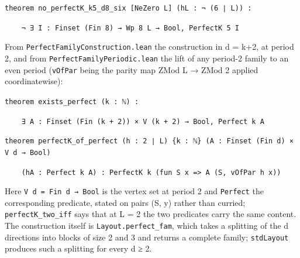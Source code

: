 \documentclass[11pt,a4paper]{article}
\theoremstyle{named}
\begin{document}
\begin{leancode}
\smallskip
\item \texttt{theorem\ \allowbreak{}no\_\allowbreak{}perfectK\_\allowbreak{}k5\_\allowbreak{}d8\_\allowbreak{}six\ \allowbreak{}[NeZero\ \allowbreak{}L]\ \allowbreak{}(hL\ \allowbreak{}:\ \allowbreak{}¬\ \allowbreak{}(6\ \allowbreak{}∣\ \allowbreak{}L))\ \allowbreak{}:}
\item \texttt{\ \allowbreak{}\ \allowbreak{}\ \allowbreak{}\ \allowbreak{}¬\ \allowbreak{}∃\ \allowbreak{}I\ \allowbreak{}:\ \allowbreak{}Finset\ \allowbreak{}(Fin\ \allowbreak{}8)\ \allowbreak{}→\ \allowbreak{}Wp\ \allowbreak{}8\ \allowbreak{}L\ \allowbreak{}→\ \allowbreak{}Bool,\ \allowbreak{}PerfectK\ \allowbreak{}5\ \allowbreak{}I}
\end{leancode}
From \texttt{PerfectFamilyConstruction.\allowbreak{}lean} the construction in d = k+2, at period 2, and from \texttt{PerfectFamilyPeriodic.\allowbreak{}lean} the lift of any period-2 family to an even period (\texttt{vOfPar} being the parity map ZMod L → ZMod 2 applied coordinatewise):

\begin{leancode}
\item \texttt{theorem\ \allowbreak{}exists\_\allowbreak{}perfect\ \allowbreak{}(k\ \allowbreak{}:\ \allowbreak{}ℕ)\ \allowbreak{}:}
\item \texttt{\ \allowbreak{}\ \allowbreak{}\ \allowbreak{}\ \allowbreak{}∃\ \allowbreak{}A\ \allowbreak{}:\ \allowbreak{}Finset\ \allowbreak{}(Fin\ \allowbreak{}(k\ \allowbreak{}+\ \allowbreak{}2))\ \allowbreak{}×\ \allowbreak{}V\ \allowbreak{}(k\ \allowbreak{}+\ \allowbreak{}2)\ \allowbreak{}→\ \allowbreak{}Bool,\ \allowbreak{}Perfect\ \allowbreak{}k\ \allowbreak{}A}
\smallskip
\item \texttt{theorem\ \allowbreak{}perfectK\_\allowbreak{}of\_\allowbreak{}perfect\ \allowbreak{}(h\ \allowbreak{}:\ \allowbreak{}2\ \allowbreak{}∣\ \allowbreak{}L)\ \allowbreak{}\{k\ \allowbreak{}:\ \allowbreak{}ℕ\}\ \allowbreak{}(A\ \allowbreak{}:\ \allowbreak{}Finset\ \allowbreak{}(Fin\ \allowbreak{}d)\ \allowbreak{}×\ \allowbreak{}V\ \allowbreak{}d\ \allowbreak{}→\ \allowbreak{}Bool)}
\item \texttt{\ \allowbreak{}\ \allowbreak{}\ \allowbreak{}\ \allowbreak{}(hA\ \allowbreak{}:\ \allowbreak{}Perfect\ \allowbreak{}k\ \allowbreak{}A)\ \allowbreak{}:\ \allowbreak{}PerfectK\ \allowbreak{}k\ \allowbreak{}(fun\ \allowbreak{}S\ \allowbreak{}x\ \allowbreak{}=\textgreater{}\ \allowbreak{}A\ \allowbreak{}(S,\ \allowbreak{}vOfPar\ \allowbreak{}h\ \allowbreak{}x))}
\end{leancode}
Here \texttt{V\ \allowbreak{}d\ \allowbreak{}=\ \allowbreak{}Fin\ \allowbreak{}d\ \allowbreak{}→\ \allowbreak{}Bool} is the vertex set at period 2 and \texttt{Perfect} the corresponding predicate, stated on pairs (S, y) rather than curried; \texttt{perfectK\_\allowbreak{}two\_\allowbreak{}iff} says that at L = 2 the two predicates carry the same content. The construction itself is \texttt{Layout.\allowbreak{}perfect\_\allowbreak{}fam}, which takes a splitting of the d directions into blocks of size 2 and 3 and returns a complete family; \texttt{stdLayout} produces such a splitting for every d ≥ 2.
\end{document}
